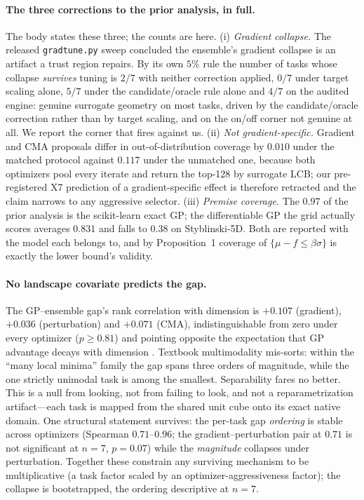 \documentclass[letterpaper]{article}
\theoremstyle{plain}
\begin{document}
\paragraph{The three corrections to the prior analysis, in full.} The body states these three; the counts are here. (i) \emph{Gradient collapse.} The released \texttt{gradtune.py} sweep concluded the ensemble's gradient collapse is an artifact a trust region repairs. By its own $5\%$ rule the number of tasks whose collapse \emph{survives} tuning is $2/7$ with neither correction applied, $0/7$ under target scaling alone, $5/7$ under the candidate/oracle rule alone and $4/7$ on the audited engine: genuine surrogate geometry on most tasks, driven by the candidate/oracle correction rather than by target scaling, and on the on/off corner not genuine at all. We report the corner that fires against us. (ii) \emph{Not gradient-specific.} Gradient and CMA proposals differ in out-of-distribution coverage by $0.010$ under the matched protocol against $0.117$ under the unmatched one, because both optimizers pool every iterate and return the top-128 by surrogate LCB; our pre-registered X7 prediction of a gradient-specific effect is therefore retracted and the claim narrows to any aggressive selector. (iii) \emph{Premise coverage.} The $0.97$ of the prior analysis is the scikit-learn exact GP; the differentiable GP the grid actually scores averages $0.831$ and falls to $0.38$ on Styblinski-5D. Both are reported with the model each belongs to, and by Proposition~1 coverage of $\{\mu-f\le\beta\sigma\}$ is exactly the lower bound's validity.

\paragraph{No landscape covariate predicts the gap.} The GP--ensemble gap's rank correlation with dimension is $+0.107$ (gradient), $+0.036$ (perturbation) and $+0.071$ (CMA), indistinguishable from zero under every optimizer ($p\geq0.81$) and pointing opposite the expectation that GP advantage decays with dimension \citep{li2024bnnsurrogates}. Textbook multimodality mis-sorts: within the ``many local minima'' family the gap spans three orders of magnitude, while the one strictly unimodal task is among the smallest. Separability fares no better. This is a null from looking, not from failing to look, and not a reparametrization artifact---each task is mapped from the shared unit cube onto its exact native domain. One structural statement survives: the per-task gap \emph{ordering} is stable across optimizers (Spearman $0.71$--$0.96$; the gradient--perturbation pair at $0.71$ is not significant at $n{=}7$, $p{=}0.07$) while the \emph{magnitude} collapses under perturbation. Together these constrain any surviving mechanism to be multiplicative (a task factor scaled by an optimizer-aggressiveness factor); the collapse is bootstrapped, the ordering descriptive at $n{=}7$.
\end{document}
